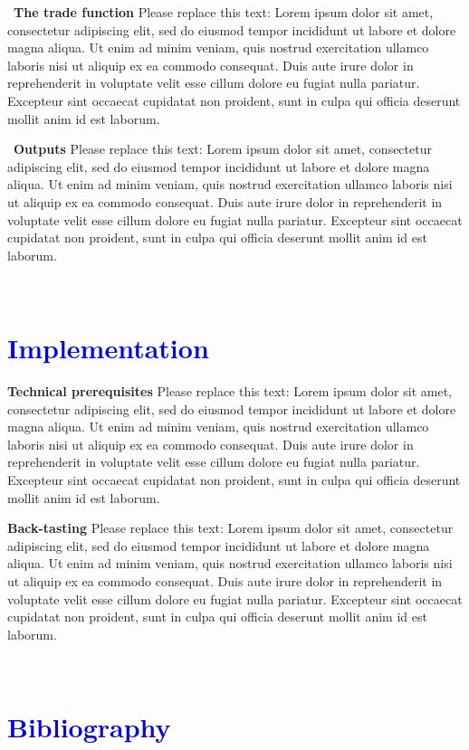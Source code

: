 \documentclass[a4paper, 11pt]{article}
\begin{document}
\ 
\textbf{The trade function }
Please replace this text: Lorem ipsum dolor sit amet, consectetur adipiscing elit, sed do eiusmod tempor incididunt ut labore et dolore magna aliqua. Ut enim ad minim veniam, quis nostrud exercitation ullamco laboris nisi ut aliquip ex ea commodo consequat. Duis aute irure dolor in reprehenderit in voluptate velit esse cillum dolore eu fugiat nulla pariatur. Excepteur sint occaecat cupidatat non proident, sunt in culpa qui officia deserunt mollit anim id est laborum.


\ 
\textbf{Outputs }
Please replace this text: Lorem ipsum dolor sit amet, consectetur adipiscing elit, sed do eiusmod tempor incididunt ut labore et dolore magna aliqua. Ut enim ad minim veniam, quis nostrud exercitation ullamco laboris nisi ut aliquip ex ea commodo consequat. Duis aute irure dolor in reprehenderit in voluptate velit esse cillum dolore eu fugiat nulla pariatur. Excepteur sint occaecat cupidatat non proident, sunt in culpa qui officia deserunt mollit anim id est laborum.


\ 
\section*{\textcolor{blue}{Implementation }}

\textbf{Technical prerequisites }
Please replace this text: Lorem ipsum dolor sit amet, consectetur adipiscing elit, sed do eiusmod tempor incididunt ut labore et dolore magna aliqua. Ut enim ad minim veniam, quis nostrud exercitation ullamco laboris nisi ut aliquip ex ea commodo consequat. Duis aute irure dolor in reprehenderit in voluptate velit esse cillum dolore eu fugiat nulla pariatur. Excepteur sint occaecat cupidatat non proident, sunt in culpa qui officia deserunt mollit anim id est laborum.


\textbf{Back-tasting }
Please replace this text: Lorem ipsum dolor sit amet, consectetur adipiscing elit, sed do eiusmod tempor incididunt ut labore et dolore magna aliqua. Ut enim ad minim veniam, quis nostrud exercitation ullamco laboris nisi ut aliquip ex ea commodo consequat. Duis aute irure dolor in reprehenderit in voluptate velit esse cillum dolore eu fugiat nulla pariatur. Excepteur sint occaecat cupidatat non proident, sunt in culpa qui officia deserunt mollit anim id est laborum.



\ 

\vspace{1cm}
\section*{\textcolor{blue}{Bibliography} }
\printbibliography[heading=none]

\end{document}
